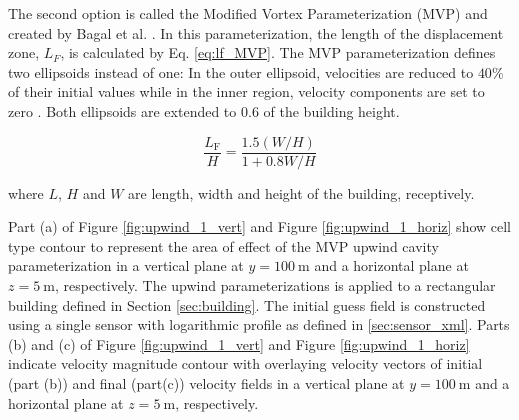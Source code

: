 The second option is called the Modified
Vortex Parameterization (MVP) and created by Bagal et al. \cite{bagal2004improved}. In this parameterization, the length of the displacement zone, $L_F$, is calculated by Eq. \ref{eq:lf_MVP}. The MVP parameterization defines two ellipsoids instead of one: In the outer ellipsoid,  velocities are reduced to $40\%$ of their initial values while in the inner region, velocity components are set to zero \cite{nelson20085}. Both ellipsoids are extended to $0.6$ of the building height.

\begin{equation}
\frac{L_{\mathrm{F}}}{H}=\frac{1.5(W / H)}{1+0.8 W / H}
\label{eq:lf_MVP}
\end{equation}

where $L$, $H$ and $W$ are length, width and height of the building, receptively.

Part (a) of Figure \ref{fig:upwind_1_vert} and Figure \ref{fig:upwind_1_horiz} show cell type contour to represent the area of effect of the MVP upwind cavity parameterization in a vertical plane at $y=100\ \si{\meter}$ and a horizontal plane at $z=5\ \si{\meter}$, respectively. The upwind parameterizations is applied to a rectangular building defined in Section \ref{sec:building}. The initial guess field is constructed using a single sensor with logarithmic profile as defined in \ref{sec:sensor_xml}. Parts (b) and (c) of Figure \ref{fig:upwind_1_vert} and Figure \ref{fig:upwind_1_horiz} indicate velocity magnitude contour with overlaying velocity vectors of initial (part (b)) and final (part(c)) velocity fields in a vertical plane at $y=100\ \si{\meter}$ and a horizontal plane at $z=5\ \si{\meter}$, respectively.

